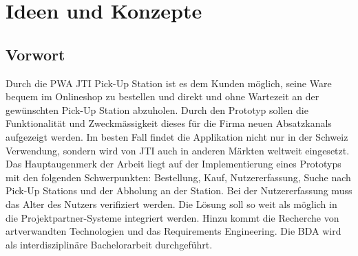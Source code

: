 \section{Ideen und Konzepte}
\subsection{Vorwort}
Durch die \gls{PWA} \ac{JTI} Pick-Up Station ist es dem Kunden möglich, seine Ware bequem im Onlineshop zu bestellen und direkt und ohne Wartezeit an der gewünschten Pick-Up Station abzuholen. Durch den Prototyp sollen die Funktionalität und Zweckmässigkeit dieses für die Firma neuen Absatzkanals aufgezeigt werden. Im besten Fall findet die Applikation nicht nur in der Schweiz Verwendung, sondern wird von \ac{JTI} auch in anderen Märkten weltweit eingesetzt. Das Hauptaugenmerk der Arbeit liegt auf der Implementierung eines Prototyps mit den folgenden Schwerpunkten: Bestellung, Kauf, Nutzererfassung, Suche nach Pick-Up Stations und der Abholung an der Station. Bei der Nutzererfassung muss das Alter des Nutzers verifiziert werden. Die Lösung soll so weit als möglich in die Projektpartner-Systeme integriert werden. Hinzu kommt die Recherche von artverwandten Technologien und das Requirements Engineering. Die BDA wird als interdisziplinäre Bachelorarbeit durchgeführt. 

